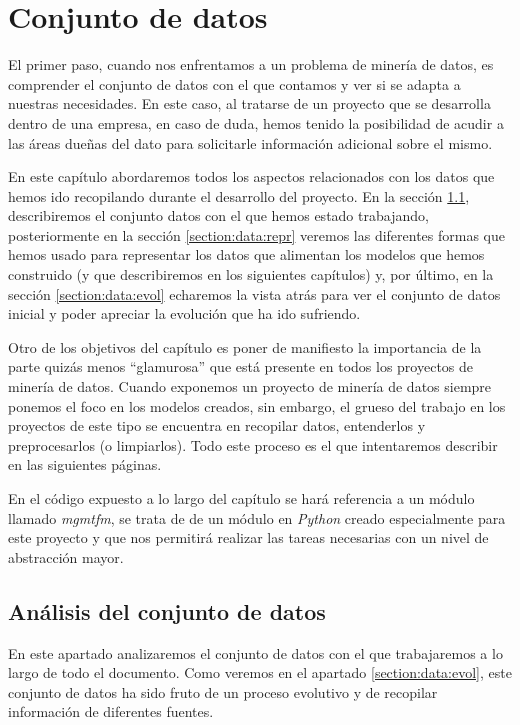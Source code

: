 \chapter{Conjunto de datos}
\label{chapter:dataset}
El primer paso, cuando nos enfrentamos a un problema de minería de datos, es comprender el conjunto de datos con el que contamos y ver si se adapta a nuestras necesidades. En este caso, al tratarse de un proyecto que se desarrolla dentro de una empresa, en caso de duda, hemos tenido la posibilidad de acudir a las áreas dueñas del dato para solicitarle información adicional sobre el mismo. 


En este capítulo abordaremos todos los aspectos relacionados con los datos que hemos ido recopilando durante el desarrollo del proyecto. En la sección \ref{section:data:ana}, describiremos el conjunto datos con el que hemos estado trabajando, posteriormente en la sección \ref{section:data:repr} veremos las diferentes formas que hemos usado para representar los datos que alimentan los modelos que hemos construido (y que describiremos en los siguientes capítulos) y, por último, en la sección \ref{section:data:evol} echaremos la vista atrás para ver el conjunto de datos inicial y poder apreciar la evolución que ha ido sufriendo.


Otro de los objetivos del capítulo es poner de manifiesto la importancia de la parte quizás menos ``glamurosa'' que está presente en todos los proyectos de minería de datos. Cuando exponemos un proyecto de minería de datos siempre ponemos el foco en los modelos creados, sin embargo, el grueso del trabajo en los proyectos de este tipo se encuentra en recopilar datos, entenderlos y preprocesarlos (o limpiarlos). Todo este proceso es el que intentaremos describir en las siguientes páginas.


En el código expuesto a lo largo del capítulo se hará referencia a un módulo llamado \textit{mgmtfm}, se trata de de un módulo en \textit{Python} creado especialmente para este proyecto y que nos permitirá realizar las tareas necesarias con un nivel de abstracción mayor. 

\section{Análisis del conjunto de datos}
\label{section:data:ana}
En este apartado analizaremos el conjunto de datos con el que trabajaremos a lo largo de todo el documento. Como veremos en el apartado \ref{section:data:evol}, este conjunto de datos ha sido fruto de un proceso evolutivo y de recopilar información de diferentes fuentes. 

